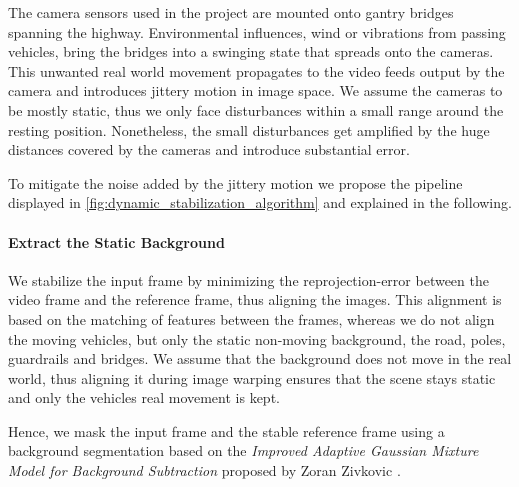 The camera sensors used in the project are mounted onto gantry bridges spanning the highway.
Environmental influences, \eg{} wind or vibrations from passing vehicles, bring the bridges into a swinging state that spreads onto the cameras. 
This unwanted real world movement propagates to the video feeds output by the camera and introduces jittery motion in image space. 
We assume the cameras to be mostly static, thus we only face disturbances within a small range around the resting position.
Nonetheless, the small disturbances get amplified by the huge distances covered by the cameras and introduce substantial error.

To mitigate the noise added by the jittery motion we propose the pipeline displayed in \autoref{fig:dynamic_stabilization_algorithm} and explained in the following.


\paragraph{Extract the Static Background}
We stabilize the input frame by minimizing the reprojection-error between the video frame and the reference frame, thus aligning the images.
This alignment is based on the matching of features between the frames, whereas we do not align the moving vehicles, but only the static non-moving background, \eg{} the road, poles, guardrails and bridges.
We assume that the background does not move in the real world, thus aligning it during image warping ensures that the scene stays static and only the vehicles real movement is kept.

Hence, we mask the input frame and the stable reference frame using a background segmentation based on
the \emph{Improved Adaptive Gaussian Mixture Model for Background Subtraction} proposed by Zoran Zivkovic \etal{} \cite{zivkovic10.5555/1018428.1020644,zivkovic10.1016/j.patrec.2005.11.005,opencv_library}.



